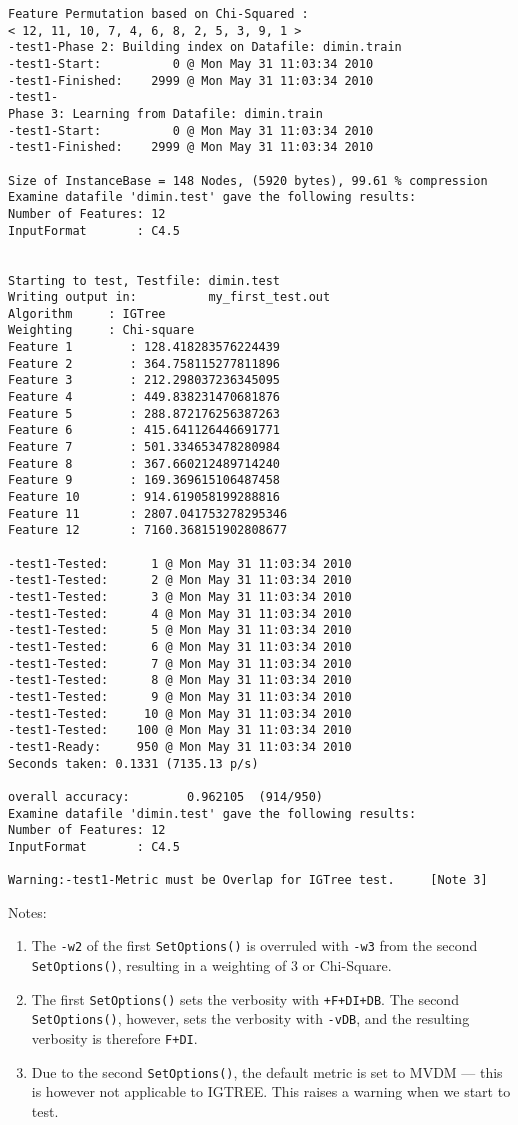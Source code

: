\documentclass{report}
\begin{document}
\begin{footnotesize}
\begin{verbatim}
Feature Permutation based on Chi-Squared :
< 12, 11, 10, 7, 4, 6, 8, 2, 5, 3, 9, 1 >
-test1-Phase 2: Building index on Datafile: dimin.train
-test1-Start:          0 @ Mon May 31 11:03:34 2010
-test1-Finished:    2999 @ Mon May 31 11:03:34 2010
-test1-
Phase 3: Learning from Datafile: dimin.train
-test1-Start:          0 @ Mon May 31 11:03:34 2010
-test1-Finished:    2999 @ Mon May 31 11:03:34 2010

Size of InstanceBase = 148 Nodes, (5920 bytes), 99.61 % compression
Examine datafile 'dimin.test' gave the following results:
Number of Features: 12
InputFormat       : C4.5


Starting to test, Testfile: dimin.test
Writing output in:          my_first_test.out
Algorithm     : IGTree
Weighting     : Chi-square
Feature 1        : 128.418283576224439
Feature 2        : 364.758115277811896
Feature 3        : 212.298037236345095
Feature 4        : 449.838231470681876
Feature 5        : 288.872176256387263
Feature 6        : 415.641126446691771
Feature 7        : 501.334653478280984
Feature 8        : 367.660212489714240
Feature 9        : 169.369615106487458
Feature 10       : 914.619058199288816
Feature 11       : 2807.041753278295346
Feature 12       : 7160.368151902808677

-test1-Tested:      1 @ Mon May 31 11:03:34 2010
-test1-Tested:      2 @ Mon May 31 11:03:34 2010
-test1-Tested:      3 @ Mon May 31 11:03:34 2010
-test1-Tested:      4 @ Mon May 31 11:03:34 2010
-test1-Tested:      5 @ Mon May 31 11:03:34 2010
-test1-Tested:      6 @ Mon May 31 11:03:34 2010
-test1-Tested:      7 @ Mon May 31 11:03:34 2010
-test1-Tested:      8 @ Mon May 31 11:03:34 2010
-test1-Tested:      9 @ Mon May 31 11:03:34 2010
-test1-Tested:     10 @ Mon May 31 11:03:34 2010
-test1-Tested:    100 @ Mon May 31 11:03:34 2010
-test1-Ready:     950 @ Mon May 31 11:03:34 2010
Seconds taken: 0.1331 (7135.13 p/s)

overall accuracy:        0.962105  (914/950)
Examine datafile 'dimin.test' gave the following results:
Number of Features: 12
InputFormat       : C4.5

Warning:-test1-Metric must be Overlap for IGTree test.     [Note 3]

\end{verbatim}
\end{footnotesize}


Notes:
\begin{enumerate}
\item The {\tt -w2} of the first {\tt SetOptions()} is overruled with
  {\tt -w3} from the second {\tt SetOptions()}, resulting in a
  weighting of 3 or Chi-Square. 
\item The first {\tt SetOptions()} sets the verbosity with {\tt +F+DI+DB}.
The second {\tt SetOptions()}, however, sets the verbosity with {\tt -vDB}, and the resulting verbosity is therefore {\tt F+DI}.
\item Due to the second {\tt SetOptions()}, the default metric is set to
MVDM --- this is however not applicable to IGTREE. This raises a warning
when we start to test.
\end{enumerate}
\end{document}
